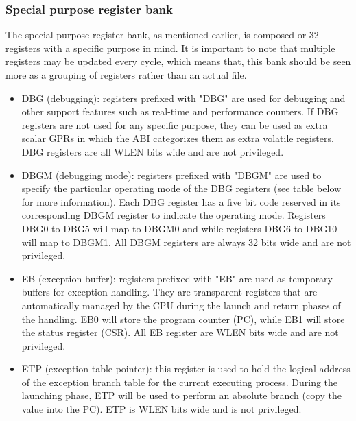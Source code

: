 \documentclass{article}
\begin{document}
            \subsubsection{Special purpose register bank}

                The special purpose register bank, as mentioned earlier, is composed or 32 registers with a specific purpose in mind. It is important to note that multiple registers may be updated every cycle, which means that, this bank should be seen more as a grouping of registers rather than an actual file.

                \begin{itemize}

                    \item DBG (debugging): registers prefixed with "DBG" are used for debugging and other support features such as real-time and performance counters. If DBG registers are not used for any specific purpose, they can be used as extra scalar GPRs in which the ABI categorizes them as extra volatile registers. DBG registers are all WLEN bits wide and are not privileged.

                    \item DBGM (debugging mode): registers prefixed with "DBGM" are used to specify the particular operating mode of the DBG registers (see table below for more information). Each DBG register has a five bit code reserved in its corresponding DBGM register to indicate the operating mode. Registers DBG0 to DBG5 will map to DBGM0 and while registers DBG6 to DBG10 will map to DBGM1. All DBGM registers are always 32 bits wide and are not privileged.

                    \item EB (exception buffer): registers prefixed with "EB" are used as temporary buffers for exception handling. They are transparent registers that are automatically managed by the CPU during the launch and return phases of the handling. EB0 will store the program counter (PC), while EB1 will store the status register (CSR). All EB register are WLEN bits wide and are not privileged.

                    \item ETP (exception table pointer): this register is used to hold the logical address of the exception branch table for the current executing process. During the launching phase, ETP will be used to perform an absolute branch (copy the value into the PC). ETP is WLEN bits wide and is not privileged.


\end{itemize}
\end{document}
